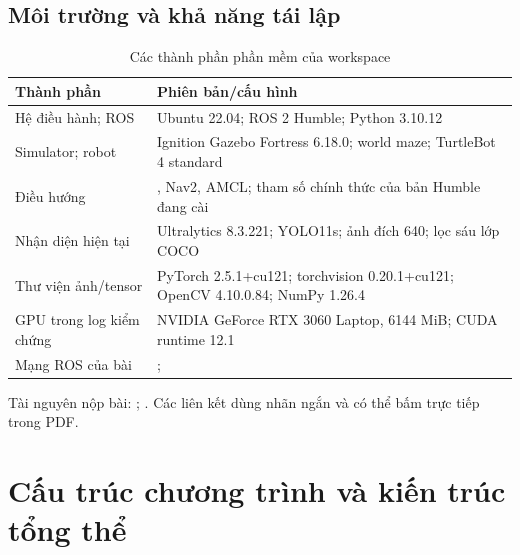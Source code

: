 \subsection{Môi trường và khả năng tái lập}
\begin{table}[H]\centering\small
\caption{Các thành phần phần mềm của workspace}
\begin{tabularx}{\linewidth}{@{}P{4cm}Y@{}}\toprule
Thành phần&Phiên bản/cấu hình\\\midrule
Hệ điều hành; ROS&Ubuntu 22.04; ROS 2 Humble; Python 3.10.12\\
Simulator; robot&Ignition Gazebo Fortress 6.18.0; world maze; TurtleBot 4 standard\\
Điều hướng&, Nav2, AMCL; tham số chính thức của bản Humble đang cài\\
Nhận diện hiện tại&Ultralytics 8.3.221; YOLO11s; ảnh đích 640; lọc sáu lớp COCO\\
Thư viện ảnh/tensor&PyTorch 2.5.1+cu121; torchvision 0.20.1+cu121; OpenCV 4.10.0.84; NumPy 1.26.4\\
GPU trong log kiểm chứng&NVIDIA GeForce RTX 3060 Laptop, 6144 MiB; CUDA runtime 12.1\\
Mạng ROS của bài&; \\\bottomrule
\end{tabularx}\end{table}
\noindent Tài nguyên nộp bài: \ghlink{}; \vidlink{}. Các liên kết dùng nhãn ngắn và có thể bấm trực tiếp trong PDF.
\clearpage

\section{Cấu trúc chương trình và kiến trúc tổng thể}
